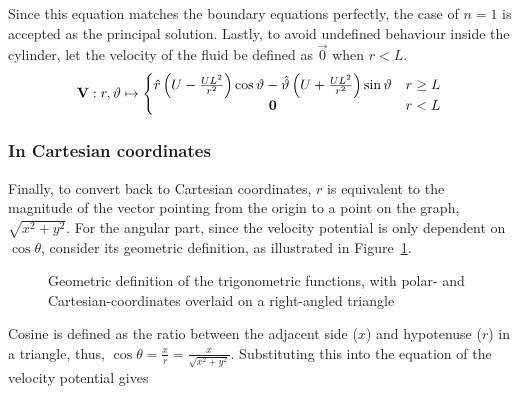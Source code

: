 Since this equation matches the boundary equations perfectly, the case of $n=1$ is accepted as the principal solution. Lastly, to avoid undefined behaviour inside the cylinder, let the velocity of the fluid be defined as $\vec{0}$ when $r<L$.
\begin{equation}\label{equation:VELOCITY:POLAR}
    \mathbf{V}:r,\vartheta\mapsto\left\{\begin{matrix}
        \hat{r}\left(U-\frac{UL^2}{r^{2}}\right)\cos\vartheta-\hat{\vartheta}\left(U+\frac{UL^2}{r^{2}}\right)\sin\vartheta&r\geq L\\
        \mathbf{0}&r<L
    \end{matrix}\right.
\end{equation}

\subsubsection{In Cartesian coordinates}\label{section:VELOCITY:CARTESIAN}
Finally, to convert back to Cartesian coordinates, $r$ is equivalent to the magnitude of the vector pointing from the origin to a point on the graph, $\sqrt{x^2+y^2}$. For the angular part, since the velocity potential is only dependent
on $\cos\theta$, consider its geometric definition, as illustrated in Figure~\ref{figure:TRIGENOMETRY}. 
\begin{figure}
    \begin{center}        
    \end{center}
    \label{figure:TRIGENOMETRY}
    \caption{Geometric definition of the trigonometric functions, with polar- and Cartesian-coordinates overlaid on a right-angled triangle}
\end{figure}
Cosine is defined as the ratio between the adjacent side ($x$) and hypotenuse ($r$) in a triangle, thus, $\cos\theta=\frac{x}{r}=\frac{x}{\sqrt{x^2+y^2}}$. Substituting this into the equation of the velocity potential gives
